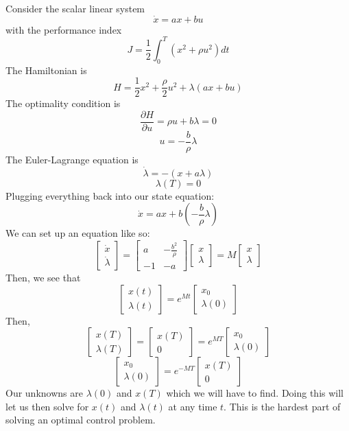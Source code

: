 \documentclass{article}
\begin{document}
\noindent
Consider the scalar linear system
\[\dot{x} = ax + bu\]
with the performance index
\[J = \frac{1}{2}\int_{0}^{T}(x^2+\rho u^2)dt\]
The Hamiltonian is
\[H = \frac{1}{2}x^2 + \frac{\rho}{2}u^2 + \lambda(ax + bu)\]
The optimality condition is
\[\frac{\partial H}{\partial u} = \rho u + b\lambda = 0\]
\[u = -\frac{b}{\rho}\lambda\]
The Euler-Lagrange equation is
\[\dot{\lambda} = -(x + a\lambda)\]
\[\lambda(T) = 0\]
Plugging everything back into our state equation:
\[\dot{x} = ax + b\left(-\frac{b}{\rho}\lambda\right)\]
We can set up an equation like so:
\[\left[\begin{matrix}
    \dot{x} \\
    \dot{\lambda}
\end{matrix}\right] = \left[\begin{matrix}
    a & -\frac{b^2}{\rho} \\[2mm]
    -1 & -a
\end{matrix}\right]\left[\begin{matrix}
    x \\ \lambda
\end{matrix}\right] = M\left[\begin{matrix}
    x \\ \lambda
\end{matrix}\right]\]
Then, we see that
\[\left[\begin{matrix}
    x(t) \\
    \lambda(t)
\end{matrix}\right] = e^{Mt}\left[\begin{matrix}
    x_0 \\ \lambda(0)
\end{matrix}\right]\]
Then,
\[\left[\begin{matrix}
    x(T) \\
    \lambda(T)
\end{matrix}\right] = \left[\begin{matrix}
    x(T) \\ 0
\end{matrix}\right] = e^{MT}\left[\begin{matrix}
    x_0 \\ \lambda(0)
\end{matrix}\right]\]
\[\left[\begin{matrix}
    x_0 \\ \lambda(0)
\end{matrix}\right] = e^{-MT}\left[\begin{matrix}
    x(T) \\ 0
\end{matrix}\right]\]
Our unknowns are $\lambda(0)$ and $x(T)$ which we will have to find. Doing this
will let us then solve for $x(t)$ and $\lambda(t)$ at any time $t$. This is the hardest part
of solving an optimal control problem.
\end{document}
